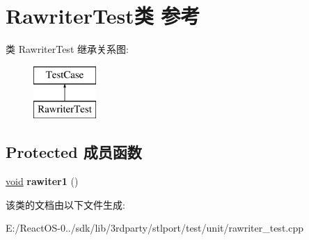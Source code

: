\hypertarget{class_rawriter_test}{}\section{Rawriter\+Test类 参考}
\label{class_rawriter_test}
类 Rawriter\+Test 继承关系图\+:\begin{figure}[H]
\begin{center}
\leavevmode
\includegraphics[height=2.000000cm]{class_rawriter_test}
\end{center}
\end{figure}
\subsection*{Protected 成员函数}
\begin{DoxyCompactItemize}
\item 
\mbox{\label{class_rawriter_test_a5024203b06f5f1953a55ea8a68e6b459}} 
\hyperlink{interfacevoid}{void} {\bfseries rawiter1} ()
\end{DoxyCompactItemize}


该类的文档由以下文件生成\+:\begin{DoxyCompactItemize}
\item 
E\+:/\+React\+O\+S-\/0../sdk/lib/3rdparty/stlport/test/unit/rawriter\+\_\+test.\+cpp\end{DoxyCompactItemize}
